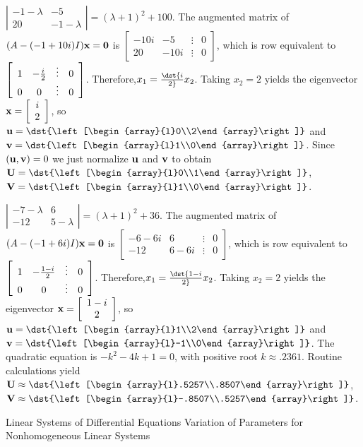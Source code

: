 \documentclass[dvips]{book}
\renewcommand{\exer}[1]{\par\medskip\;\noindent{\color{red}\bf #1.}}
\numberwithin{example}{section}
\numberwithin{equation}{section}
\numberwithin{theorem}{section}
\numberwithin{table}{section}
\numberwithin{figure}{section}
\newcommand{\twocol}[2]{\left[\begin{array}{l}#1\\#2\end{array}\right]}
\begin{document}
\exer{10.6.38}
$\left|\begin{array}{cc}-1-\lambda&-5\\20&-1-\lambda
\end{array}\right|=(\lambda+1)^2+100$.
The augmented matrix of $(A-(-1+10i)I){\bf x}={\bf 0}$ is
$\left[\begin{array}{cccr}-10i&-5&\vdots&0\\
20&-10i&\vdots&0 \end{array}\right]$,
which is row equivalent to
$\left[\begin{array}{cccr} 1&-{i\over2}&\vdots&0\\ 0&0&\vdots&0
\end{array}\right]$.
Therefore,$x_1=\dst{i\over2}x_2$. Taking $x_2=2$
yields the eigenvector
 ${\bf x}=\left[\begin{array}{c}i\\2\end{array}\right]$,
so ${\bf u}=\dst{\twocol02}$ and ${\bf v}=\dst{\twocol10}$.
Since $({\bf u},{\bf v})=0$ we just normalize ${\bf u}$ and ${\bf v}$
to obtain
${\bf U}=\dst{\twocol01}$, ${\bf V}=\dst{\twocol10}$.


\exer{10.6.40}
$\left|\begin{array}{cc}-7-\lambda&6\\-12&5-\lambda
\end{array}\right|=(\lambda+1)^2+36$.
The augmented matrix of $(A-(-1+6i)I){\bf x}={\bf 0}$ is
$\left[\begin{array}{cccr}-6-6i&6&\vdots&0\\
-12&6-6i&\vdots&0 \end{array}\right]$,
which is row equivalent to
$\left[\begin{array}{cccr} 1&-{1-i\over2}&\vdots&0\\ 0&0&\vdots&0
\end{array}\right]$.
Therefore,$x_1=\dst{1-i\over2}x_2$. Taking $x_2=2$
yields the eigenvector
 ${\bf x}=\left[\begin{array}{c}1-i\\2\end{array}\right]$,
so ${\bf u}=\dst{\twocol12}$ and ${\bf v}=\dst{\twocol{-1}0}$.
The quadratic equation is $-k^2-4k+1=0$, with positive root
$k\approx.2361$.
 Routine calculations yield
 ${\bf U}\approx\dst{\twocol{.5257}{.8507}}$,
${\bf V}\approx\dst{\twocol{-.8507}{.5257}}$.



 {Linear Systems of Differential  Equations}
{Variation of Parameters for Nonhomogeneous Linear Systems}
\end{document}
